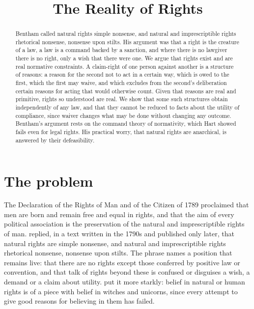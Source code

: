 \documentclass{situationist-preprint}
\title{The Reality of Rights}
\begin{document}
\maketitle

\begin{abstract}
Bentham called natural rights simple nonsense, and natural and imprescriptible rights rhetorical nonsense, nonsense upon stilts. His argument was that a right is the creature of a law, a law is a command backed by a sanction, and where there is no lawgiver there is no right, only a wish that there were one. We argue that rights exist and are real normative constraints. A claim-right of one person against another is a structure of reasons: a reason for the second not to act in a certain way, which is owed to the first, which the first may waive, and which excludes from the second's deliberation certain reasons for acting that would otherwise count. Given that reasons are real and primitive, rights so understood are real. We show that some such structures obtain independently of any law, and that they cannot be reduced to facts about the utility of compliance, since waiver changes what may be done without changing any outcome. Bentham's argument rests on the command theory of normativity, which Hart showed fails even for legal rights. His practical worry, that natural rights are anarchical, is answered by their defeasibility.
\end{abstract}

\section{The problem}

The Declaration of the Rights of Man and of the Citizen of 1789 proclaimed that men are born and remain free and equal in rights, and that the aim of every political association is the preservation of the natural and imprescriptible rights of man. \citet{Bentham1843} replied, in a text written in the 1790s and published only later, that natural rights are simple nonsense, and natural and imprescriptible rights rhetorical nonsense, nonsense upon stilts. The phrase names a position that remains live: that there are no rights except those conferred by positive law or convention, and that talk of rights beyond these is confused or disguises a wish, a demand or a claim about utility. \citet[ch.~6]{MacIntyre1981} put it more starkly: belief in natural or human rights is of a piece with belief in witches and unicorns, since every attempt to give good reasons for believing in them has failed.
\end{document}
